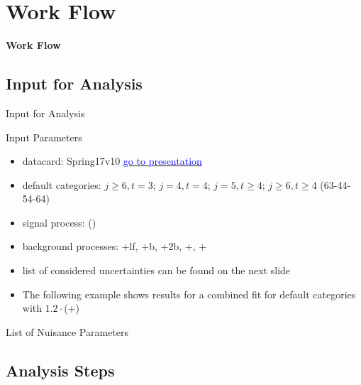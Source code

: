 \section{Work Flow}
\begin{frame}
\centering
\textbf{\huge{Work Flow}}
\end{frame}
\subsection{Input for Analysis}

\begin{frame}{Input for Analysis}

\begin{block}{Input Parameters}
\begin{itemize}
\item datacard: Spring17v10 \href{https://indico.cern.ch/event/628833/contributions/2624507/attachments/1474840/2283855/KITv10p2.pdf}{\textcolor{blue}{go to presentation}}
\item default categories: $j\geq 6, t=3$; $j=4, t=4$; $j=5, t\geq 4$; $j\geq 6, t\geq 4$ (63-44-54-64)
\item signal process: \ttbarH(\bbbar)
\item background processes: \ttbar+lf, \ttbar+b, \ttbar+2b, \ttbar+\bbbar, \ttbar + \ccbar
\item list of considered uncertainties can be found on the next slide
\end{itemize}
\end{block}
\begin{itemize}
\item The following example shows results for a combined fit for default categories with $\num[round-precision=1]{1.2}\cdot$(\ttbar+\bbbar)
\end{itemize}

\end{frame}

\begin{frame}{List of Nuisance Parameters}

% 
\end{frame}


\subsection{Analysis Steps}

